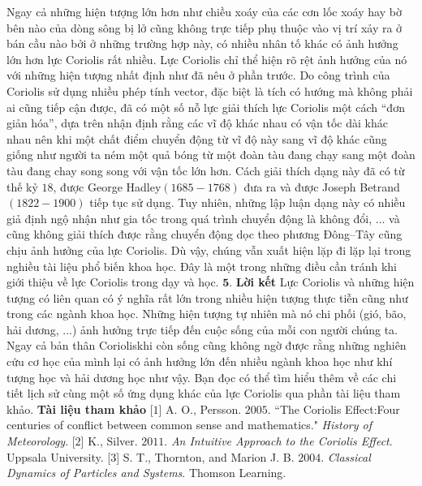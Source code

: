\begin{multicols}{2}
	\vskip 0.1cm
	Ngay cả những hiện tượng lớn hơn như chiều xoáy của các cơn lốc xoáy hay bờ bên nào của dòng sông bị lở cũng không trực tiếp phụ thuộc vào vị trí xảy ra ở bán cầu nào bởi ở những trường hợp này, có nhiều nhân tố khác có ảnh hưởng lớn hơn lực Coriolis rất nhiều. Lực Coriolis chỉ thể hiện rõ rệt ảnh hưởng của nó với những hiện tượng nhất định như đã nêu ở phần trước.
	\vskip 0.1cm
	Do công trình của Coriolis sử dụng nhiều phép tính vector, đặc biệt là tích có hướng mà không phải ai cũng tiếp cận được, đã có một số nỗ lực giải thích lực Coriolis một cách “đơn giản hóa”, dựa trên nhận định rằng các vĩ độ khác nhau có vận tốc dài khác nhau nên khi một chất điểm chuyển động từ vĩ độ này sang vĩ độ khác cũng giống như người ta ném một quả bóng từ một đoàn tàu đang chạy sang một đoàn tàu đang chay song song với vận tốc lớn hơn. Cách giải thích dạng này đã có từ thế kỷ $18$, được George Hadley\linebreak $(1685-1768)$ đưa ra và được Joseph \linebreak Betrand $(1822-1900)$ tiếp tục sử dụng. Tuy nhiên, những lập luận dạng này có nhiều giả định ngộ nhận như gia tốc trong quá trình chuyển động là không đổi, ... và cũng không giải thích được rằng chuyển động dọc theo phương Đông--Tây cũng chịu ảnh hưởng của lực Coriolis. Dù vậy, chúng vẫn xuất hiện lặp đi lặp lại trong nghiều tài liệu phổ biến khoa học. Đây là một trong những điều cần tránh khi giới thiệu về lực Coriolis trong dạy và học.
	\vskip 0.1cm
	$\pmb{5.}$ \textbf{Lời kết}
	\vskip 0.1cm
	Lực Coriolis và những hiện tượng có liên quan có ý nghĩa rất lớn trong nhiều hiện tượng thực tiễn cũng như trong các ngành khoa học.  Những hiện tượng tự nhiên mà nó chi phối (gió, bão, hải dương, ...) ảnh hưởng trực tiếp đến cuộc sống của mỗi con người chúng ta. Ngay cả bản thân Coriolis\linebreak khi còn sống cũng không ngờ được rằng những nghiên cứu cơ học của mình lại có ảnh hưởng lớn đến nhiều ngành khoa học như khí tượng học và hải dương học như vậy. Bạn đọc có thể tìm hiểu thêm về các chi tiết lịch sử cùng một số ứng dụng khác của lực Coriolis qua phần tài liệu tham khảo.
	\vskip 0.1cm
	\textbf{Tài liệu tham khảo}
	\vskip 0.1cm
	[$1$] A. O., Persson. $2005$. ``The Coriolis Effect:\linebreak Four centuries of conflict between common sense and mathematics." \textit{History of Meteorology}.
	\vskip 0.1cm 
	[$2$] K., Silver. $2011$. \textit{An Intuitive Approach to the Coriolis Effect}. Uppsala University.
	\vskip 0.1cm
	[$3$] S. T., Thornton, and Marion J. B. $2004$. \textit{Classical Dynamics of Particles and Systems}. Thomson Learning.
\end{multicols}